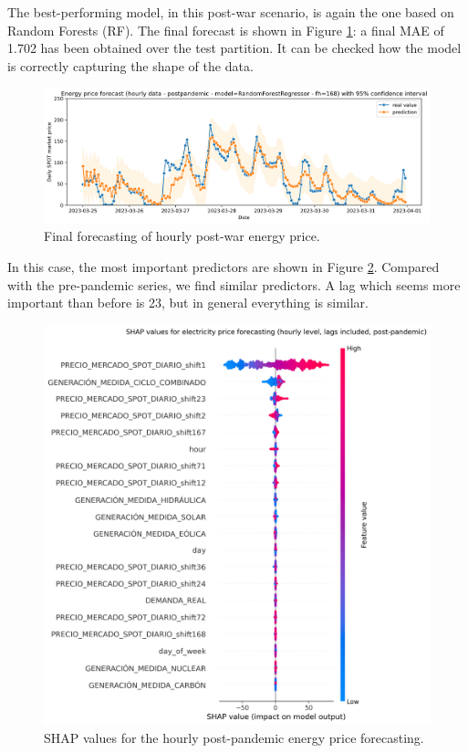 The best-performing model, in this post-war scenario, is again the one based on Random Forests (RF). The final forecast is shown in Figure \ref{fig:forecast-hourly-post}: a final MAE of 1.702 has been obtained over the test partition. It can be checked how the model is correctly capturing the shape of the data.

\begin{figure}[H]
\centering
    \caption{Final forecasting of hourly post-war energy price.}
    \label{fig:forecast-hourly-post}
    \includegraphics[scale=0.4]{images/analysis/forecast-hourly-post}
\end{figure}

In this case, the most important predictors are shown in Figure \ref{fig:shap-hourly-post}. Compared with the pre-pandemic series, we find similar predictors. A lag which seems more important than before is 23, but in general everything is similar.

\begin{figure}[H]
\centering
    \centering
    \includegraphics[width=0.7\linewidth]{images/analysis/shap-hourly-post}
    \caption{SHAP values for the hourly post-pandemic energy price forecasting.}
    \label{fig:shap-hourly-post}
\end{figure}

